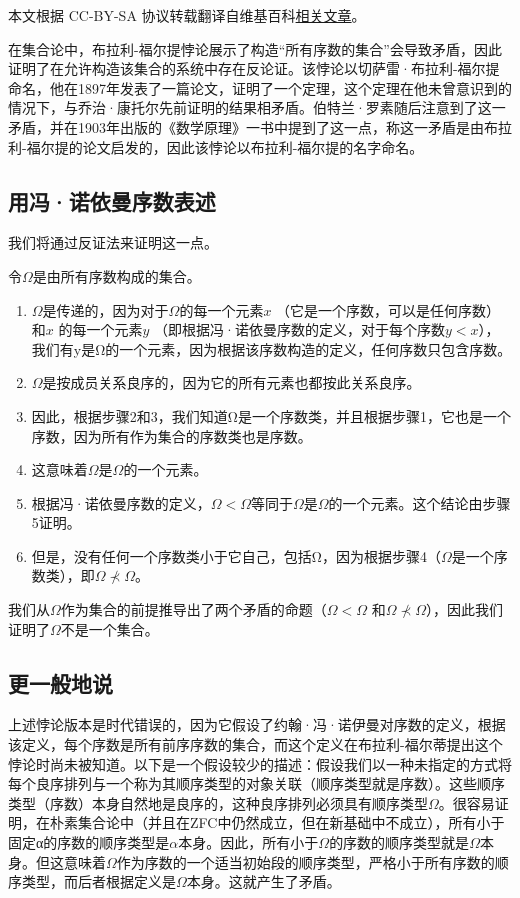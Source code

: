 
本文根据 CC-BY-SA 协议转载翻译自维基百科\href{https://en.wikipedia.org/wiki/Burali-Forti_paradox}{相关文章}。

在集合论中，布拉利-福尔提悖论展示了构造“所有序数的集合”会导致矛盾，因此证明了在允许构造该集合的系统中存在反论证。该悖论以切萨雷·布拉利-福尔提命名，他在1897年发表了一篇论文，证明了一个定理，这个定理在他未曾意识到的情况下，与乔治·康托尔先前证明的结果相矛盾。伯特兰·罗素随后注意到了这一矛盾，并在1903年出版的《数学原理》一书中提到了这一点，称这一矛盾是由布拉利-福尔提的论文启发的，因此该悖论以布拉利-福尔提的名字命名。
\subsection{用冯·诺依曼序数表述}
我们将通过反证法来证明这一点。

令$\Omega$是由所有序数构成的集合。
\begin{enumerate}
\item $\Omega$是传递的，因为对于$\Omega$的每一个元素$x$ （它是一个序数，可以是任何序数）和$x$ 的每一个元素$y$ （即根据冯·诺依曼序数的定义，对于每个序数$y < x$），我们有y是Ω的一个元素，因为根据该序数构造的定义，任何序数只包含序数。
\item $\Omega$是按成员关系良序的，因为它的所有元素也都按此关系良序。
\item 因此，根据步骤2和3，我们知道Ω是一个序数类，并且根据步骤1，它也是一个序数，因为所有作为集合的序数类也是序数。
\item 这意味着$\Omega$是$\Omega$的一个元素。
\item 根据冯·诺依曼序数的定义，$\Omega< \Omega$等同于$\Omega$是$\Omega$的一个元素。这个结论由步骤5证明。
\item 但是，没有任何一个序数类小于它自己，包括Ω，因为根据步骤4（$\Omega$是一个序数类），即$\Omega \not\prec \Omega$。
\end{enumerate}
我们从$\Omega$作为集合的前提推导出了两个矛盾的命题（$\Omega< \Omega$ 和$\Omega \not\prec \Omega$），因此我们证明了$\Omega$不是一个集合。
\subsection{更一般地说}
上述悖论版本是时代错误的，因为它假设了约翰·冯·诺伊曼对序数的定义，根据该定义，每个序数是所有前序序数的集合，而这个定义在布拉利-福尔蒂提出这个悖论时尚未被知道。以下是一个假设较少的描述：假设我们以一种未指定的方式将每个良序排列与一个称为其顺序类型的对象关联（顺序类型就是序数）。这些顺序类型（序数）本身自然地是良序的，这种良序排列必须具有顺序类型$\Omega$。很容易证明，在朴素集合论中（并且在ZFC中仍然成立，但在新基础中不成立），所有小于固定α的序数的顺序类型是$\alpha$本身。因此，所有小于$\Omega$的序数的顺序类型就是$\Omega$本身。但这意味着$\Omega$作为序数的一个适当初始段的顺序类型，严格小于所有序数的顺序类型，而后者根据定义是$\Omega$本身。这就产生了矛盾。

